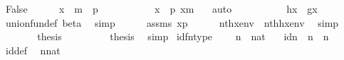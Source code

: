 \begin{isabellebody}
\ False\isanewline
\ \ \ \ \isamarkupfalse%
\ {\isacartoucheopen}x\ {\isasymin}\ m\ {\isasymunion}\ p{\isacartoucheclose}\isanewline
\ \ \ \ \isamarkupfalse%
\isanewline
\ \ \ \ \ \ {\isachardoublequoteopen}x\ {\isasymin}\ p{\isachardoublequoteclose}\ {\isachardoublequoteopen}x{\isasymnotin}m{\isachardoublequoteclose}\ \ \isamarkupfalse%
\ auto\isanewline
\ \ \ \ \isamarkupfalse%
\isanewline
\ \ \ \ \isamarkupfalse%
\ {\isachardoublequoteopen}{\isacharquery}{\kern0pt}h{\isacharbackquote}{\kern0pt}x\ {\isacharequal}{\kern0pt}\ g{\isacharbackquote}{\kern0pt}x{\isachardoublequoteclose}\isanewline
\ \ \ \ \ \ \isamarkupfalse%
\ union{\isacharunderscore}{\kern0pt}fun{\isacharunderscore}{\kern0pt}def\ beta\ \isamarkupfalse%
\ simp\isanewline
\ \ \ \ \isamarkupfalse%
\ assms\ {\isacartoucheopen}x{\isasymin}p{\isacartoucheclose}\isanewline
\ \ \ \ \isamarkupfalse%
\ {\isachardoublequoteopen}nth{\isacharparenleft}{\kern0pt}x{\isacharcomma}{\kern0pt}env{\isacharparenright}{\kern0pt}\ {\isacharequal}{\kern0pt}\ nth{\isacharparenleft}{\kern0pt}{\isacharquery}{\kern0pt}h{\isacharbackquote}{\kern0pt}x{\isacharcomma}{\kern0pt}env{\isacharprime}{\kern0pt}{\isacharparenright}{\kern0pt}{\isachardoublequoteclose}\ \isamarkupfalse%
\ simp\isanewline
\ \ \ \ \isamarkupfalse%
\ \isamarkupfalse%
\ {\isacharquery}{\kern0pt}thesis\ \isacommand{{\isachardot}{\kern0pt}}\isamarkupfalse%
\isanewline
\ \ \isamarkupfalse%
\isanewline
\ \ \isamarkupfalse%
\ \isamarkupfalse%
\ {\isacharquery}{\kern0pt}thesis\ \isamarkupfalse%
\ simp\isanewline
{}\isamarkupfalse%
%
\endisatagproof
{\isafoldproof}%
%
\isadelimproof
\isanewline
%
\endisadelimproof
\isanewline
\isanewline
{}\isamarkupfalse%
\ id{\isacharunderscore}{\kern0pt}fn{\isacharunderscore}{\kern0pt}type\ {\isacharcolon}{\kern0pt}\isanewline
\ \ \ {\isachardoublequoteopen}n\ {\isasymin}\ nat{\isachardoublequoteclose}\isanewline
\ \ \ {\isachardoublequoteopen}id{\isacharparenleft}{\kern0pt}n{\isacharparenright}{\kern0pt}\ {\isasymin}\ n\ {\isasymrightarrow}\ n{\isachardoublequoteclose}\isanewline
%
\isadelimproof
\ \ %
\endisadelimproof
%
\isatagproof
{}\isamarkupfalse%
\ id{\isacharunderscore}{\kern0pt}def\ \isamarkupfalse%
\ {\isacartoucheopen}n{\isasymin}nat{\isacartoucheclose}\ \isamarkupfalse%

\end{isabellebody}
